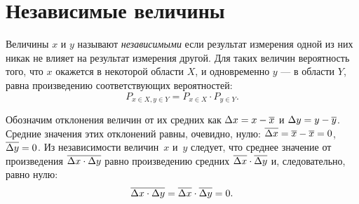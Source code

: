 
%


\section{Независимые величины}\label{sec:independent}
Величины $x$ и $y$ называют \emph{независимыми} если результат измерения одной 
из них никак не влияет на результат измерения другой. Для таких величин вероятность того, что  $x$ окажется в некоторой области $X$, и одновременно $y$ --- в области $Y$, 
равна произведению соответствующих вероятностей:
\[
P_{x\in X , y\in Y} = P_{x\in X}\cdot P_{y\in Y}.
\]

Обозначим отклонения величин от их средних как $\Delta x=x-\overline{x}$ и 
$\Delta y=y-\overline{y}$.
Средние значения этих отклонений равны, очевидно, нулю: 
$\overline{\Delta
x}=\overline{x}-\overline{x}=0$, $\overline{\Delta y}=0$.
Из независимости величин~$x$ и~$y$ следует,
что среднее значение от произведения 
$\overline{\Delta x\cdot\Delta y}$
равно произведению средних $\overline{\Delta x}\cdot\overline{\Delta y}$
и, следовательно, равно нулю:
\begin{equation}
\overline{\Delta x\cdot\Delta y}=\overline{\Delta x}\cdot\overline{\Delta
y}=0.\label{eq:indep}
\end{equation}

